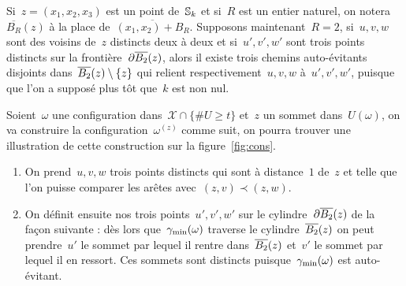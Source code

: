 			\begin{rem}
				Si~$z = (x_1, x_2, x_3)$ est un point de~$\mathbb{S}_k$ et si~$R$ est un entier naturel, on notera~$\overline{B_R}(z)$  à la place de~$\overline{(x_1, x_2) + B_R}$. Supposons maintenant~$R=2$, si~$u, v, w$ sont des voisins de~$z$ distincts deux à deux et si~$u', v', w'$ sont trois points distincts sur la frontière~$\partial \overline{B_{2}}(z)$, alors il existe trois chemins auto-évitants disjoints dans~$\overline{B_{2}}(z)\setminus\{z\}$ qui relient respectivement~$u, v, w$ à~$u', v', w'$, puisque que l'on a supposé plus tôt que~$k$ est non nul. 
			\end{rem}
			\begin{dem}
				Soient~$\omega$ une configuration dans~$\mathcal{X}\cap\{\# U \geq t\}$ et~$z$ un sommet dans~$U(\omega)$, on va construire la configuration~$\omega^{(z)}$  comme suit, on pourra trouver une illustration de cette construction sur la figure~\ref{fig:cons}.
				\begin{enumerate}
					\item\label{item:cons:a} On prend~$u,v,w$  trois points distincts qui sont  à distance~$1$ de~$z$  et telle que l'on puisse comparer les arêtes avec~$(z,v)\prec (z,w)$.
					
					\item\label{item:cons:b} On définit ensuite nos trois points~$u',v',w'$ sur le cylindre~$\partial\overline{B_{2}}(z)$ de la façon suivante : dès lors que~$\gamma_{\mathrm{min}}(\omega)$ traverse le cylindre~$\overline{B_{2}}(z)$ on peut prendre~$u'$  le sommet par lequel il rentre dans~$\overline{B_{2}}(z)$ et~$v'$  le sommet par lequel il en ressort. Ces sommets sont distincts puisque~$\gamma_{\mathrm{min}}(\omega)$ est auto-évitant. 
					

\end{enumerate}
\end{dem}
